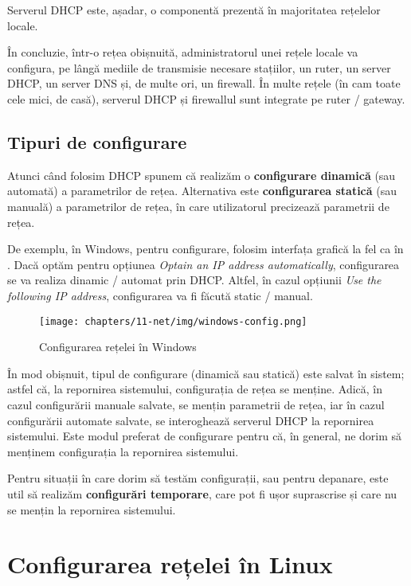 Serverul DHCP este, așadar, o componentă prezentă în majoritatea rețelelor locale.

În concluzie, într-o rețea obișnuită, administratorul unei rețele locale va configura, pe lângă mediile de transmisie necesare stațiilor, un ruter, un server DHCP, un server DNS și, de multe ori, un firewall.
În multe rețele (în cam toate cele mici, de casă), serverul DHCP și firewallul sunt integrate pe ruter / gateway.

\subsection{Tipuri de configurare}
\label{sec:net:config:types}

Atunci când folosim DHCP spunem că realizăm o \textbf{configurare dinamică} (sau automată) a parametrilor de rețea.
Alternativa este \textbf{configurarea statică} (sau manuală) a parametrilor de rețea, în care utilizatorul precizează parametrii de rețea.

De exemplu, în Windows, pentru configurare, folosim interfața grafică la fel ca în .
Dacă optăm pentru opțiunea \textit{Optain an IP address automatically}, configurarea se va realiza dinamic / automat prin DHCP.
Altfel, în cazul opțiunii \textit{Use the following IP address}, configurarea va fi făcută static / manual.

\begin{figure}[!htbp]
  \centering
  \texttt{[image: chapters/11-net/img/windows-config.png]}
  \caption{Configurarea rețelei în Windows}
  \label{fig:net:windows-config}
\end{figure}

În mod obișnuit, tipul de configurare (dinamică sau statică) este salvat în sistem; astfel că, la repornirea sistemului, configurația de rețea se menține.
Adică, în cazul configurării manuale salvate, se mențin parametrii de rețea, iar în cazul configurării automate salvate, se interoghează serverul DHCP la repornirea sistemului.
Este modul preferat de configurare pentru că, în general, ne dorim să menținem configurația la repornirea sistemului.

Pentru situații în care dorim să testăm configurații, sau pentru depanare, este util să realizăm \textbf{configurări temporare}, care pot fi ușor suprascrise și care nu se mențin la repornirea sistemului.

\section{Configurarea rețelei în Linux}
\label{sec:net:linux-config}

